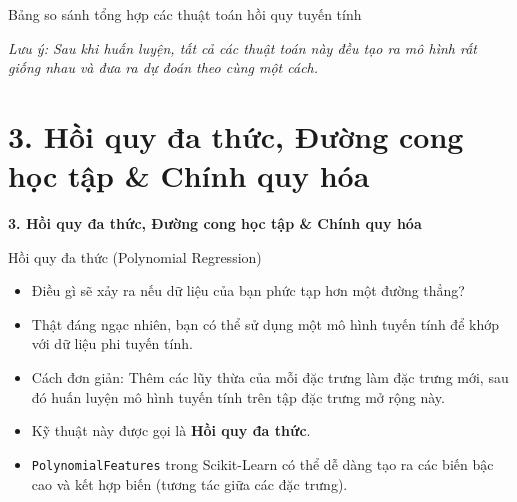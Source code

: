\documentclass[aspectratio=169]{beamer}
\begin{document}
\begin{frame}{Bảng so sánh tổng hợp các thuật toán hồi quy tuyến tính}
\begin{table}[]
\end{table}
\textit{Lưu ý: Sau khi huấn luyện, tất cả các thuật toán này đều tạo ra mô hình rất giống nhau và đưa ra dự đoán theo cùng một cách.}
\end{frame}

\section{3. Hồi quy đa thức, Đường cong học tập \& Chính quy hóa}

\begin{frame}
\vfill\centering\LARGE\textbf{3. Hồi quy đa thức, Đường cong học tập \& Chính quy hóa}\vfill
\end{frame}

\begin{frame}{Hồi quy đa thức (Polynomial Regression)}
\begin{itemize}
    \item Điều gì sẽ xảy ra nếu dữ liệu của bạn phức tạp hơn một đường thẳng?
    \item Thật đáng ngạc nhiên, bạn có thể sử dụng một mô hình tuyến tính để khớp với dữ liệu phi tuyến tính.
    \item Cách đơn giản: Thêm các lũy thừa của mỗi đặc trưng làm đặc trưng mới, sau đó huấn luyện mô hình tuyến tính trên tập đặc trưng mở rộng này.
    \item Kỹ thuật này được gọi là \textbf{Hồi quy đa thức}.
    \item \texttt{PolynomialFeatures} trong Scikit-Learn có thể dễ dàng tạo ra các biến bậc cao và kết hợp biến (tương tác giữa các đặc trưng).
\end{itemize}
\end{frame}
\end{document}
